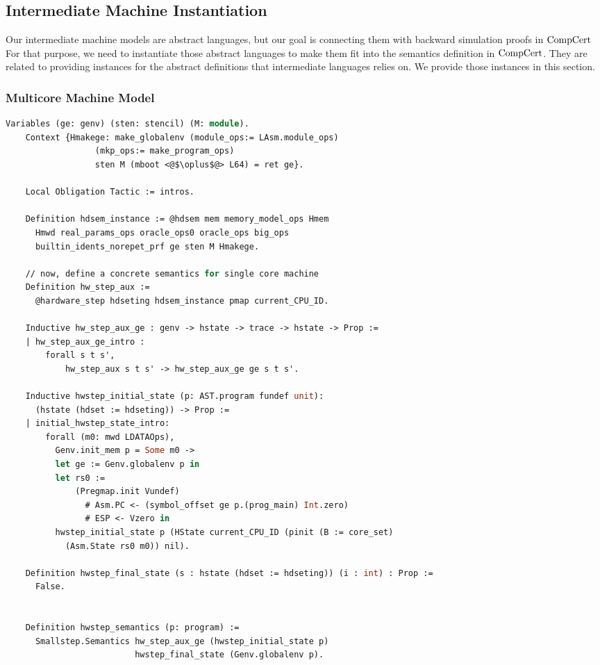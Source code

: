 \subsection{Intermediate Machine Instantiation}
\label{chapter:certikos:subsec:intermediate-machine-instantiation}

Our intermediate machine models are abstract languages, but 
our goal is connecting them with backward simulation proofs in $\mathrm{CompCert}$~
For that purpose, 
we need to instantiate those abstract languages to make them fit into 
the semantics definition in $\mathrm{CompCert}$.
They are related to
providing instances 
for the abstract definitions that intermediate languages relies on. 
We provide those instances in this section. 

\subsubsection{Multicore Machine Model}

\begin{lstlisting}[language=Caml]
    Variables (ge: genv) (sten: stencil) (M: module).
    Context {Hmakege: make_globalenv (module_ops:= LAsm.module_ops)
                  (mkp_ops:= make_program_ops) 
                  sten M (mboot <@$\oplus$@> L64) = ret ge}.        
    
    Local Obligation Tactic := intros.
    
    Definition hdsem_instance := @hdsem mem memory_model_ops Hmem 
      Hmwd real_params_ops oracle_ops0 oracle_ops big_ops 
      builtin_idents_norepet_prf ge sten M Hmakege.
    
    // now, define a concrete semantics for single core machine
    Definition hw_step_aux :=
      @hardware_step hdseting hdsem_instance pmap current_CPU_ID.
      
    Inductive hw_step_aux_ge : genv -> hstate -> trace -> hstate -> Prop :=
    | hw_step_aux_ge_intro : 
        forall s t s',
            hw_step_aux s t s' -> hw_step_aux_ge ge s t s'.
    
    Inductive hwstep_initial_state (p: AST.program fundef unit): 
      (hstate (hdset := hdseting)) -> Prop := 
    | initial_hwstep_state_intro: 
        forall (m0: mwd LDATAOps),
          Genv.init_mem p = Some m0 ->
          let ge := Genv.globalenv p in
          let rs0 :=
              (Pregmap.init Vundef)
                # Asm.PC <- (symbol_offset ge p.(prog_main) Int.zero)
                # ESP <- Vzero in
          hwstep_initial_state p (HState current_CPU_ID (pinit (B := core_set)
            (Asm.State rs0 m0)) nil).

    Definition hwstep_final_state (s : hstate (hdset := hdseting)) (i : int) : Prop :=
      False.
      
         
    Definition hwstep_semantics (p: program) :=
      Smallstep.Semantics hw_step_aux_ge (hwstep_initial_state p) 
                          hwstep_final_state (Genv.globalenv p).
    
\end{lstlisting}

